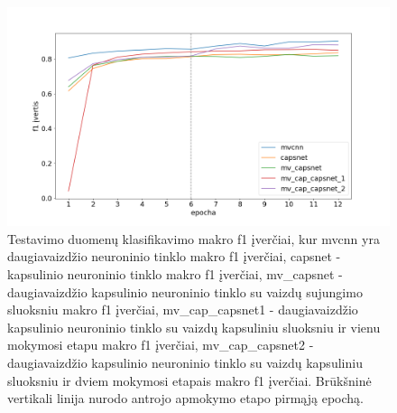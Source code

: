 \begin{figure}[H]
	\centering
	\includegraphics[scale=0.4]{img/micro.png}
	\caption{
		Testavimo duomenų klasifikavimo makro f1 įverčiai, kur mvcnn yra daugiavaizdžio neuroninio tinklo makro f1 įverčiai, capsnet - kapsulinio neuroninio tinklo makro f1 įverčiai, mv\_capsnet - daugiavaizdžio kapsulinio neuroninio tinklo su vaizdų sujungimo sluoksniu makro f1 įverčiai, mv\_cap\_capsnet1 - daugiavaizdžio kapsulinio neuroninio tinklo su vaizdų kapsuliniu sluoksniu ir vienu mokymosi etapu makro f1 įverčiai, mv\_cap\_capsnet2 - daugiavaizdžio kapsulinio neuroninio tinklo su vaizdų kapsuliniu sluoksniu ir dviem mokymosi etapais makro f1 įverčiai. Brūkšninė vertikali linija nurodo antrojo apmokymo etapo pirmąją epochą.
	}
	\label{img:macro_f1}
\end{figure}

